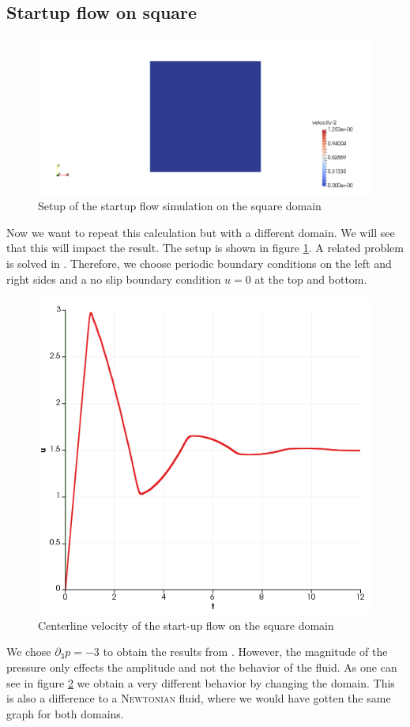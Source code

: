 \documentclass[12pt,a4paper,twoside, open=right]{scrreprt}
\theoremstyle{definition}
\theoremstyle{plain}
\begin{document}
\subsection{Startup flow on square}
\begin{figure}
    \centering
    \includegraphics[width=\textwidth]{SquareSetup}
    \caption{Setup of the startup flow simulation on the square domain}
    \label{fig:squaresetup}
\end{figure}
Now we want to repeat this calculation but with a different domain. We will see that this will impact the result. The setup is shown in figure \ref{fig:squaresetup}. A related problem is solved in \cite{A.S.RDuarte2008}. Therefore, we choose periodic boundary conditions on the left and right sides and a no slip boundary condition $u=0$ at the top and bottom.
\begin{figure}
    \centering
    \includegraphics[width=\textwidth]{SquareCenterline}
    \caption{Centerline velocity of the start-up flow on the square domain}
    \label{fig:squarecenterline}
\end{figure}
We chose $\partial_3 p=-3$ to obtain the results from \cite{A.S.RDuarte2008}. However, the magnitude of the pressure only effects the amplitude and not the behavior of the fluid. As one can see in figure \ref{fig:squarecenterline} we obtain a very different behavior by changing the domain. This is also a difference to a \textsc{Newtonian} fluid, where we would have gotten the same graph for both domains. 
\end{document}
